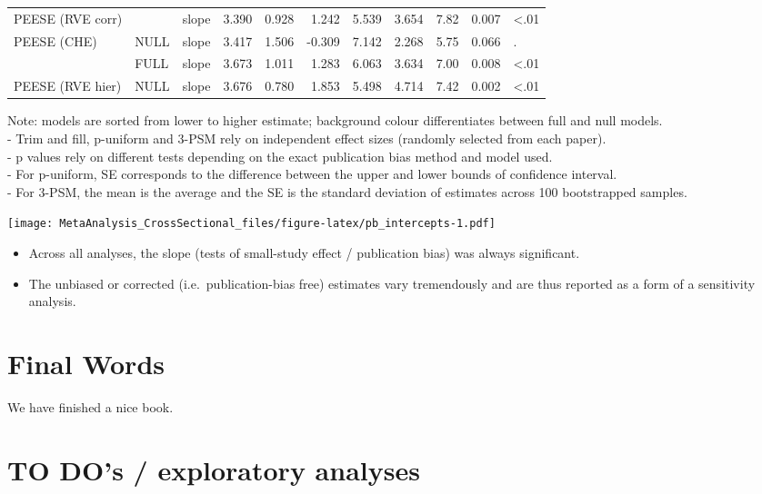 \documentclass[
]{book}
\providecommand{\tightlist}{%
  \setlength{\itemsep}{0pt}\setlength{\parskip}{0pt}}
\begin{document}
\begin{tabular}{l|l|l|r|r|r|r|r|r|r|l}
\cline{1-11}
PEESE (RVE corr) &  & slope & 3.390 & 0.928 & 1.242 & 5.539 & 3.654 & 7.82 & 0.007 & <.01\\
\cline{1-1}
\cline{3-11}
PEESE (CHE) & \multirow[t]{-2}{*}{\raggedright\arraybackslash NULL} & slope & 3.417 & 1.506 & -0.309 & 7.142 & 2.268 & 5.75 & 0.066 & .\\
\cline{1-11}
 & FULL & slope & 3.673 & 1.011 & 1.283 & 6.063 & 3.634 & 7.00 & 0.008 & <.01\\
\cline{2-11}
\multirow[t]{-2}{*}{\raggedright\arraybackslash PEESE (RVE hier)} & NULL & slope & 3.676 & 0.780 & 1.853 & 5.498 & 4.714 & 7.42 & 0.002 & <.01\\
\hline
\end{tabular}

Note: models are sorted from lower to higher estimate; background colour differentiates between full and null models.\\
- Trim and fill, p-uniform and 3-PSM rely on independent effect sizes (randomly selected from each paper).\\
- p values rely on different tests depending on the exact publication bias method and model used.\\
- For p-uniform, SE corresponds to the difference between the upper and lower bounds of confidence interval.\\
- For 3-PSM, the mean is the average and the SE is the standard deviation of estimates across
100 bootstrapped samples.

\texttt{[image: MetaAnalysis\_CrossSectional\_files/figure-latex/pb\_intercepts-1.pdf]}

\begin{itemize}
\tightlist
\item
  Across all analyses, the slope (tests of small-study effect / publication bias)
  was always significant.\\
\item
  The unbiased or corrected (i.e.~publication-bias free) estimates vary tremendously
  and are thus reported as a form of a sensitivity analysis.
\end{itemize}

\hypertarget{final-words}{%
\chapter{Final Words}\label{final-words}}

We have finished a nice book.

\hypertarget{todos}{%
\chapter{TO DO's / exploratory analyses}\label{todos}}
\end{document}
